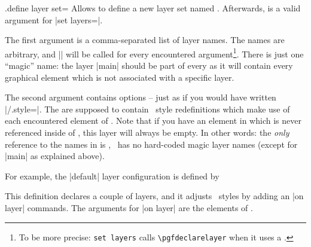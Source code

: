 \begin{handler}{{.define layer set}=}
	Allows to define a new layer set named . Afterwards,  is a valid argument for |set layers=|.

	The first argument  is a comma-separated list of layer names. The names are arbitrary, and |\pgfdeclarelayer| will be called for every encountered argument\footnote{To be more precise: \texttt{set layers} calls \texttt{\textbackslash pgfdeclarelayer} when it uses a .}. There is just one ``magic'' name: the layer |main| should be part of every  as it will contain every graphical element which is not associated with a specific layer.

	The second argument  contains options -- just as if you would have written |/.style=|. The  are supposed to contain \PGFPlots\ style redefinitions which make use of each encountered element of . Note that if you have an element in  which is never referenced inside of , this layer will always be empty. In other words: the \emph{only} reference to the names in  is , \PGFPlots\ has no hard-coded magic layer names (except for |main| as explained above).

	For example, the |default| layer configuration is defined by
\begin{codeexample}
\end{codeexample}
	\noindent This definition declares a couple of layers, and it adjusts \PGFPlots\ styles by adding an |on layer| commands. The arguments for |on layer| are the elements of .


\end{handler}
